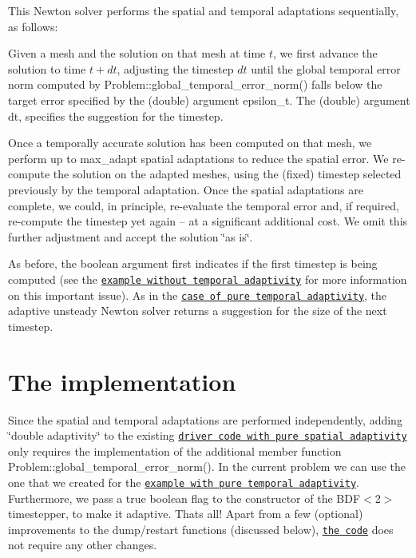 This Newton solver performs the spatial and temporal adaptations sequentially, as follows\+:
\begin{DoxyEnumerate}
\item Given a mesh and the solution on that mesh at time $ t $, we first advance the solution to time $ t + dt$, adjusting the timestep $ dt $ until the global temporal error norm computed by {\ttfamily Problem\+::global\+\_\+temporal\+\_\+error\+\_\+norm()} falls below the target error specified by the ({\ttfamily double}) argument {\ttfamily epsilon\+\_\+t}. The ({\ttfamily double}) argument {\ttfamily dt}, specifies the suggestion for the timestep.
\item Once a temporally accurate solution has been computed on that mesh, we perform up to {\ttfamily max\+\_\+adapt} spatial adaptations to reduce the spatial error. We re-\/compute the solution on the adapted meshes, using the (fixed) timestep selected previously by the temporal adaptation. Once the spatial adaptations are complete, we could, in principle, re-\/evaluate the temporal error and, if required, re-\/compute the timestep yet again -- at a significant additional cost. We omit this further adjustment and accept the solution \char`\"{}as is\char`\"{}.
\end{DoxyEnumerate}As before, the boolean argument {\ttfamily first} indicates if the first timestep is being computed (see the \href{../../two_d_unsteady_heat_adapt/html/index.html}{\tt example without temporal adaptivity} for more information on this important issue). As in the \href{../../two_d_unsteady_heat_t_adapt/html/index.html}{\tt case of pure temporal adaptivity}, the adaptive unsteady Newton solver returns a suggestion for the size of the next timestep.



 

\hypertarget{index_impl}{}\section{The implementation}\label{index_impl}
Since the spatial and temporal adaptations are performed independently, adding \char`\"{}double adaptivity\char`\"{} to the existing \href{../../two_d_unsteady_heat_ALE/html/index.html}{\tt driver code with pure spatial adaptivity} only requires the implementation of the additional member function {\ttfamily Problem\+::global\+\_\+temporal\+\_\+error\+\_\+norm()}. In the current problem we can use the one that we created for the \href{../../two_d_unsteady_heat_t_adapt/html/index.html}{\tt example with pure temporal adaptivity}. Furthermore, we pass a true boolean flag to the constructor of the {\ttfamily B\+D\+F$<$2$>$} timestepper, to make it adaptive. That\textquotesingle{}s all! Apart from a few (optional) improvements to the dump/restart functions (discussed below), \href{../../../../demo_drivers/unsteady_heat/two_d_unsteady_heat_2adapt/two_d_unsteady_heat_2adapt.cc}{\tt the code} does not require any other changes.



